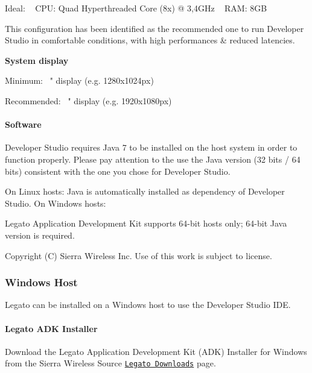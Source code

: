 Ideal\+: ~\newline
 C\+P\+U\+: Quad Hyperthreaded Core (8x) @ 3,4\+G\+Hz ~\newline
 R\+A\+M\+: 8\+G\+B ~\newline


This configuration has been identified as the recommended one to run Developer Studio in comfortable conditions, with high performances \& reduced latencies.

{\bfseries System display}

Minimum\+: ~" display (e.\+g. 1280x1024px) ~\newline


Recommended\+: ~" display (e.\+g. 1920x1080px) ~\newline
\hypertarget{getstarted_d_srequirements_getstartedDSrequirements_software}{}\paragraph{Software}\label{getstarted_d_srequirements_getstartedDSrequirements_software}
Developer Studio requires Java 7 to be installed on the host system in order to function properly. Please pay attention to the use the Java version (32 bits / 64 bits) consistent with the one you chose for Developer Studio.

On Linux hosts\+: Java is automatically installed as dependency of Developer Studio. On Windows hosts\+:

Legato Application Development Kit supports 64-\/bit hosts only; 64-\/bit Java version is required.





Copyright (C) Sierra Wireless Inc. Use of this work is subject to license. \hypertarget{getstartedDSwindows}{}\subsubsection{Windows Host}\label{getstartedDSwindows}
Legato can be installed on a Windows host to use the Developer Studio I\+D\+E.\hypertarget{getstarted_d_swindows_getstartedDSwindows_adkInstaller}{}\paragraph{Legato A\+D\+K Installer}\label{getstarted_d_swindows_getstartedDSwindows_adkInstaller}
Download the Legato Application Development Kit (A\+D\+K) Installer for Windows from the Sierra Wireless Source \href{http://source.sierrawireless.com/resources/legato/downloads/}{\tt Legato Downloads} page.

